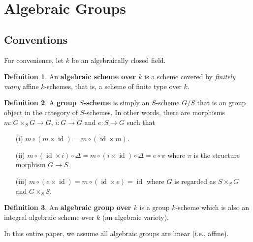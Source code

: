 \documentclass[12pt]{report}
\theoremstyle{remark}
\theoremstyle{definition}
\newtheorem{definition}{Definition}[section]
\newcommand{\D}[0]{\Delta}
\newcommand{\id}[0]{\operatorname{id}}
\begin{document}
    \section{Algebraic Groups}
    \subsection{Conventions}
    For convenience, let $k$ be an algebraically closed field.
    \begin{definition}
        An \textbf{algebraic scheme over $k$} is a scheme covered by \textit{finitely many} affine $k$-schemes, that is, a scheme of finite type over $k$.
    \end{definition}
    \begin{definition}
        A \textbf{group $S$-scheme} is simply an $S$-scheme $G/S$ that is an group object in the category of $S$-schemes. In other words, there are morphisms $m:G\times_S G\to G$, $i:G\to G$ and $e:S\to G$ such that
        \begin{enumerate}
            \item[(i)] $m\circ (m\times \id)=m\circ(\id\times m)$.
            \item[(ii)] $m\circ (\id\times i)\circ\D=m\circ (i\times \id)\circ\D=e\circ\pi$ where $\pi$ is the structure morphism $G\to S$.
            \item[(iii)] $m\circ(e\times \id)=m\circ(\id\times e)=\id$ where $G$ is regarded as $S\times_S G$ and $G\times_S S$.
        \end{enumerate}
    \end{definition}
    \begin{definition}
        An \textbf{algebraic group over $k$} is a group $k$-scheme which is also an integral algebraic scheme over $k$ (an algebraic variety).
    \end{definition}
    In this entire paper, we assume all algebraic groups are linear (i.e., affine).
\end{document}
